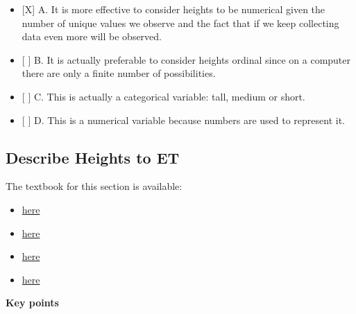 \documentclass[]{article}
\providecommand{\tightlist}{%
  \setlength{\itemsep}{0pt}\setlength{\parskip}{0pt}}
\begin{document}
\begin{itemize}
\tightlist
\item
  {[}X{]} A. It is more effective to consider heights to be numerical
  given the number of unique values we observe and the fact that if we
  keep collecting data even more will be observed.
\item
  {[} {]} B. It is actually preferable to consider heights ordinal since
  on a computer there are only a finite number of possibilities.
\item
  {[} {]} C. This is actually a categorical variable: tall, medium or
  short.
\item
  {[} {]} D. This is a numerical variable because numbers are used to
  represent it.
\end{itemize}

\hypertarget{describe-heights-to-et}{%
\subsection{Describe Heights to ET}\label{describe-heights-to-et}}

The textbook for this section is available:

\begin{itemize}
\tightlist
\item
  \href{https://rafalab.github.io/dsbook/distributions.html\#case-study-describing-student-heights}{here}
\item
  \href{https://rafalab.github.io/dsbook/distributions.html\#distribution-function}{here}
\item
  \href{https://rafalab.github.io/dsbook/distributions.html\#cdf-intro}{here}
\item
  \href{https://rafalab.github.io/dsbook/distributions.html\#histograms}{here}
\end{itemize}

\textbf{Key points}
\end{document}
